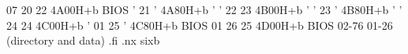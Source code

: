   07         20      22        4A00H+b              BIOS
  '          21      '         4A80H+b                '
  '          22      23        4B00H+b                '
  '          23      '         4B80H+b                '
  '          24      24        4C00H+b                '
  01         25      '         4C80H+b              BIOS
  01         26      25        4D00H+b              BIOS
02-76      01-26                            (directory and data)
.fi
.nx sixb

















